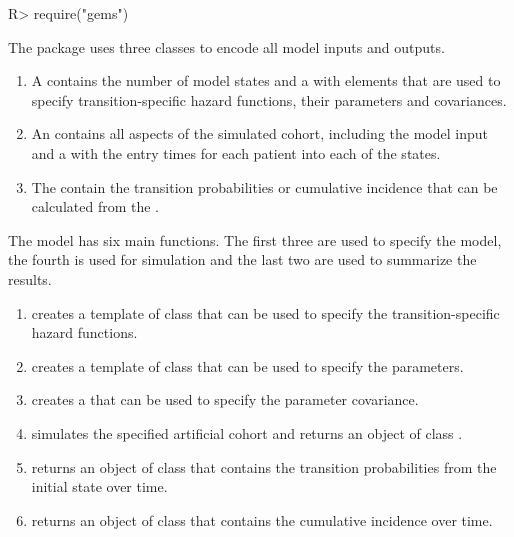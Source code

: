 \begin{Schunk}
\begin{Sinput}
R> require("gems")
\end{Sinput}
\end{Schunk}

The package  uses three classes to encode all model inputs and outputs.
\begin{enumerate}
  \item A  contains the number of model states and a  with elements that are used to specify transition-specific hazard functions, their parameters and covariances. 
  \item An  contains all aspects of the simulated cohort, including the model input and a  with the entry times for each patient into each of the states. 
  \item The  contain the transition probabilities or cumulative incidence that can be calculated from the .
\end{enumerate}

The model has six main functions. The first three are used to specify the model, the fourth is used for simulation and the last two are used to summarize the results. 
\begin{enumerate}
  \item {} creates a template of class
     that can be used to specify the transition-specific hazard functions. 
  \item {} creates a template of class  that can be used to specify the parameters.
  \item {} creates a  that can be used to specify the parameter covariance. 
  \item {} simulates the specified artificial cohort and returns an object of class .
  \item {} returns an object of class
     that contains the transition probabilities from the initial state over time.
  \item {} returns an object of class
     that contains the cumulative incidence over time.
\end{enumerate}

